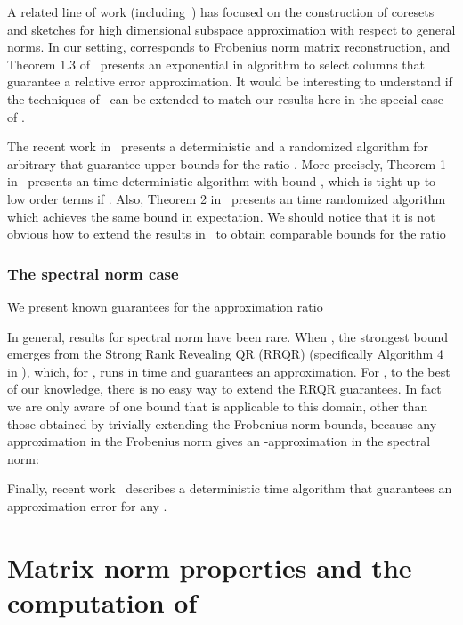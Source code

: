 A related line of work (including~\cite{DV07,FL11, FMSW10,SV07})
has focused on the construction of coresets and
sketches for high dimensional subspace approximation with respect
to general  norms. In our setting,  corresponds to
Frobenius norm matrix reconstruction, and Theorem 1.3 of~\cite{SV07}
presents an exponential in  algorithm to select
  columns that
guarantee a relative error approximation. It would be interesting to
understand if the techniques of~\cite{DV07,FL11, FMSW10,SV07}
can be extended to match our results here in the special case
of .

The recent work in~\cite{GS2011} presents a deterministic and a randomized algorithm for arbitrary
 that guarantee upper bounds for the ratio .
More precisely, Theorem 1 in~\cite{GS2011} presents an  time deterministic algorithm with bound , which is tight up to
low order terms if . Also, Theorem 2 in~\cite{GS2011} presents an  time randomized algorithm
which achieves the same bound in expectation. We should notice that it is not obvious how to
extend the results in~\cite{GS2011} to obtain comparable bounds for the ratio


\subsubsection{The spectral norm case}

We present known guarantees for the approximation ratio

In general,
results for spectral norm have been rare.
When ,
the strongest bound emerges from the Strong Rank Revealing
 QR (RRQR) \cite{GE96} (specifically Algorithm 4 in \cite{GE96}), which, for
, runs in  time and guarantees an
 approximation. For , to the
best of our knowledge, there is no easy way to extend the
RRQR guarantees. In fact we are only aware of one bound that is
applicable to this domain, other than those obtained by trivially
extending the Frobenius norm bounds, because
any -approximation in the Frobenius norm gives an
-approximation in the spectral norm:

Finally, recent work~\cite{AB11} describes a deterministic  time algorithm that guarantees an approximation error 
 for any .

\section{Matrix norm properties and the computation of }
\label{sec:prel}

